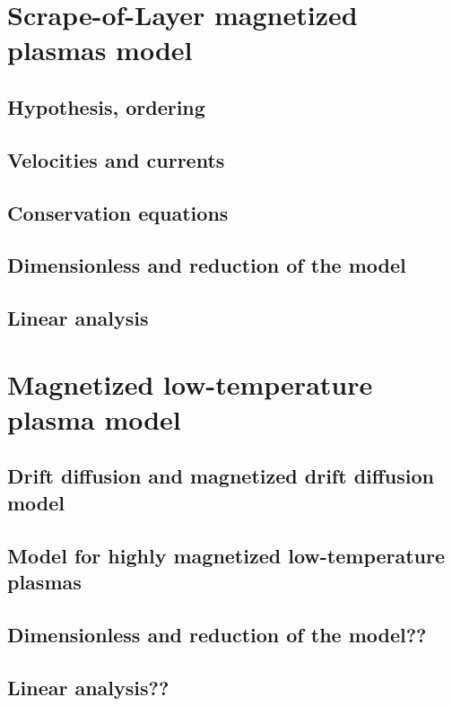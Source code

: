 	
	\section{Scrape-of-Layer magnetized plasmas model}
		\subsection{Hypothesis, ordering}
		\subsection{Velocities and currents}
		\subsection{Conservation equations}
		\subsection{Dimensionless and reduction of the model}
		\subsection{Linear analysis}
	\section{Magnetized low-temperature plasma model}
		\subsection{Drift diffusion and magnetized drift diffusion model}
		\subsection{Model for highly magnetized low-temperature plasmas}
		\subsection{Dimensionless and reduction of the model??}
		\subsection{Linear analysis??}
